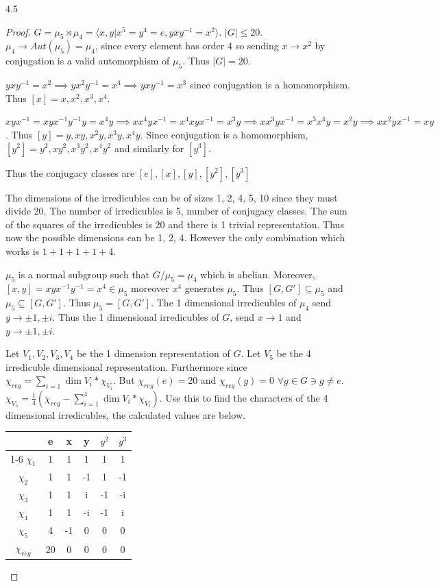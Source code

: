 \documentclass{article}
\newcommand{\angles}[1]{\langle #1 \rangle}
\begin{document}
\bigskip

\begin{PROB}{4.5}\label{Problem 4.5.}
    
\end{PROB}
\begin{proof}
    $G = \mu_5 \rtimes \mu_4 = \angles{x, y | x^5= y^4=e, yxy^{-1}=x^2}$. $|G| \leq 20$. $\mu_4 \to Aut(\mu_5) = \mu_4$, since every element has order 4 so sending $x \to x^2$ by conjugation is a valid automorphism of $\mu_5$. Thus $|G| = 20$. 
    
    $yxy^{-1} = x^2 \implies yx^2y^{-1} = x^4 \implies yxy^{-1} = x^3$ since conjugation is a homomorphism. Thus $[x] = x, x^2, x^3, x^4$. 
    
    
    $xyx^{-1} = xyx^{-1}y^{-1}y = x^4y \implies x x^4 y x^{-1} = x^4 xyx^{-1} = x^3 y \implies x x^3 y x^{-1} = x^{3}x^{4}y = x^2y \implies x x^{2} y x^{-1} = xy$. Thus $[y] = y, xy, x^2y, x^3y, x^4y$. Since conjugation is a homomorphism, $[y^2] = y^2, xy^{2}, x^3y^2, x^4y^2$ and similarly for $[y^3]$. 
    
    Thus the conjugacy classes are $[e], [x], [y], [y^2], [y^3]$ 

    
    The dimensions of the irredicubles can be of sizes 1, 2, 4, 5, 10 since they must divide 20. The number of irredicubles is 5, number of conjugacy classes. The sum of the squares of the irredicubles is 20 and there is 1 trivial representation. Thus now the possible dimensions can be 1, 2, 4. However the only combination which works is $1 + 1 + 1 + 1 + 4$. 
    
    $\mu_5$ is a normal subgroup such that $G / \mu_5 = \mu_4$ which is abelian. Moreover, $[x, y] = xyx^{-1}y^{-1} = x^4 \in \mu_5$ moreover $x^4$ generates $\mu_5$. Thus $[G, G'] \subseteq \mu_5$ and $\mu_5 \subseteq [G, G']$. Thus $\mu_5 = [G,G']$. The 1 dimensional irredicubles of $\mu_4$ send $y \to \pm 1, \pm i$. Thus the 1 dimensional irredicubles of $G$, send $x \to 1$ and $y \to \pm 1, \pm i$.


    Let $V_1, V_2, V_3, V_4$ be the 1 dimension representation of $G$. Let $V_5$ be the 4 irredicuble dimensional representation.    
    Furthermore since $\chi_{reg} = \sum_{i = 1} \dim V_i * \chi_{V_i}$. But $\chi_{reg}(e) = 20$ and $\chi_{reg}(g) = 0$ $\forall g \in G \ni g \neq e$. $\chi_{V_5} = \frac{1}{4} (\chi_{reg} - \sum_{i = 1}^4 \dim V_i * \chi_{V_i})$. Use this to find the characters of the 4 dimensional irredicubles, the calculated values are below.

    
    \begin{tabular}{c | c c c c c }
        & e & x & y & $y^2$ & $y^3$  \\
        \cline{1-6}
        $\chi_1$ & 1 & 1 & 1 & 1 & 1 \\
        $\chi_2$ & 1 & 1 & -1 & 1 & -1 \\
        $\chi_3$ & 1 & 1 & i & -1 & -i \\
        $\chi_4$ & 1 & 1 & -i & -1 & i \\
        $\chi_5$ & 4 & -1 & 0 & 0 & 0 \\
        $\chi_{reg}$ & 20 & 0 & 0 & 0 & 0 
    \end{tabular}
\end{proof}
\end{document}
